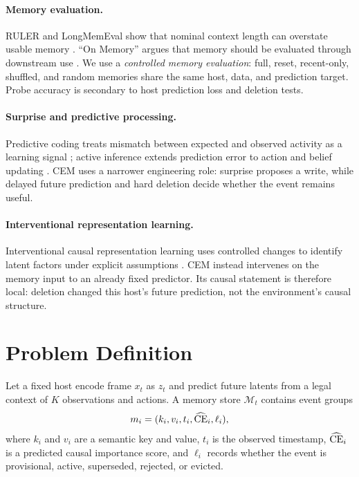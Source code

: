 \paragraph{Memory evaluation.}
RULER and LongMemEval show that nominal context length can overstate usable
memory \citep{r_ruler,r_longmemeval}. ``On Memory'' argues that memory should
be evaluated through downstream use \citep{r_onmemory}. We use a
\emph{controlled memory evaluation}: full, reset, recent-only, shuffled, and
random memories share the same host, data, and prediction target. Probe
accuracy is secondary to host prediction loss and deletion tests.

\paragraph{Surprise and predictive processing.}
Predictive coding treats mismatch between expected and observed activity as a
learning signal \citep{r_predictivecoding}; active inference extends prediction
error to action and belief updating \citep{r_activeinference}. CEM uses a
narrower engineering role: surprise proposes a write, while delayed future
prediction and hard deletion decide whether the event remains useful.

\paragraph{Interventional representation learning.}
Interventional causal representation learning uses controlled changes to
identify latent factors under explicit assumptions \citep{r_interventionalcrl}.
CEM instead intervenes on the memory input to an already fixed predictor. Its
causal statement is therefore local: deletion changed this host's future
prediction, not the environment's causal structure.

\section{Problem Definition}
\label{sec:problem}

Let a fixed host encode frame $x_t$ as $z_t$ and predict future latents from a
legal context of $K$ observations and actions. A memory store
$\mathcal M_t$ contains event groups
\[
m_i=(k_i,v_i,t_i,\widehat{\operatorname{CE}}_i,\ell_i),
\]
where $k_i$ and $v_i$ are a semantic key and value, $t_i$ is the observed
timestamp, $\widehat{\operatorname{CE}}_i$ is a predicted causal importance score, and
$\ell_i$ records whether the event is provisional, active, superseded,
rejected, or evicted.

